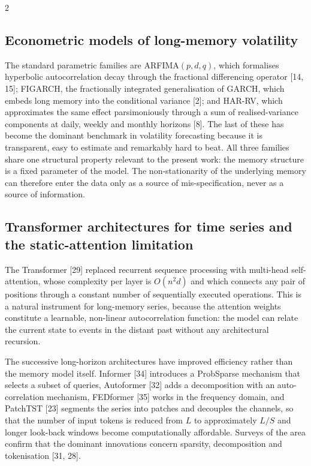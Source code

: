 \documentclass[a4paper,10pt,twoside]{article}
\begin{document}
\begin{multicols}{2}
\subsection{Econometric models of long-memory volatility}

The standard parametric families are ARFIMA$(p,d,q)$, which formalises hyperbolic autocorrelation
decay through the fractional differencing operator [14, 15];
FIGARCH, the fractionally integrated generalisation of GARCH, which embeds long memory into the
conditional variance [2]; and HAR-RV, which approximates the same
effect parsimoniously through a sum of realised-variance components at daily, weekly and monthly
horizons [8]. The last of these has become the dominant benchmark in volatility
forecasting because it is transparent, easy to estimate and remarkably hard to beat. All three
families share one structural property relevant to the present work: the memory structure is a
fixed parameter of the model. The non-stationarity of the underlying memory can therefore enter
the data only as a source of mis-specification, never as a source of information.

\subsection{Transformer architectures for time series and the static-attention limitation}

The Transformer [29] replaced recurrent sequence processing with
multi-head self-attention, whose complexity per layer is $O(n^2 d)$ and which connects any pair of
positions through a constant number of sequentially executed operations. This is a natural
instrument for long-memory series, because the attention weights constitute a learnable, non-linear
autocorrelation function: the model can relate the current state to events in the distant past
without any architectural recursion.

The successive long-horizon architectures have improved efficiency rather than the memory model
itself. Informer [34] introduces a ProbSparse mechanism that selects a subset of
queries, Autoformer [32] adds a decomposition with an auto-correlation
mechanism, FEDformer [35] works in the frequency domain, and PatchTST
[23] segments the series into patches and decouples the channels, so that the number
of input tokens is reduced from $L$ to approximately $L/S$ and longer look-back windows become
computationally affordable. Surveys of the area confirm that the dominant innovations concern
sparsity, decomposition and tokenisation [31, 28].


\end{multicols}
\end{document}
